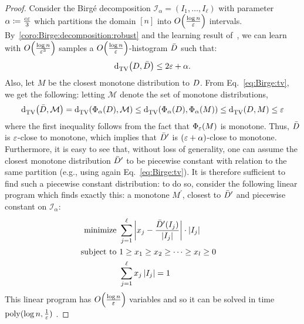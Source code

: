 \begin{proof}  Consider the Birg\'e decomposition $\mathcal{I}_\alpha=(I_1,\dots,I_\ell)$ with parameter $\alpha\coloneqq\frac{c \varepsilon}{3}$ which partitions the domain $[n]$ into $\bigO{\frac{\log n}{\eps}}$ intervals.
  By~\cref{coro:Birge:decomposition:robust} and the learning result of~\cite{Birge:87}, we can learn with $\bigO{\frac{\log n}{\eps^3}}$ samples a $\bigO{\frac{\log n}{\eps}}$-histogram $\bar{D}$ such that:
   \begin{equation}
   {\operatorname{d}_{\textrm{TV}}^{}\!\left({\ensuremath{D}, \bar{\ensuremath{D}}}\right)}\leq 2\varepsilon+\alpha.
\end{equation}    
  Also, let $M$ be the closest monotone distribution to $D$. From Eq.~\eqref{eq:Birge:tv}, we get the following: letting $\mathcal{M}$ denote the set of monotone distributions,   
 \begin{equation}
 {\operatorname{d}_{\textrm{TV}}^{}\!\left({\bar{\ensuremath{D}}, \mathcal{M}}\right)}={\operatorname{d}_{\textrm{TV}}^{}\!\left({\Phi_{\alpha}(D), \mathcal{M}}\right)}\leq {\operatorname{d}_{\textrm{TV}}^{}\!\left({\Phi_{\alpha}(\ensuremath{D}), \Phi_{\alpha}(M)}\right)}\leq {\operatorname{d}_{\textrm{TV}}^{}\!\left({\ensuremath{D}, M}\right)}\leq \varepsilon 
 \end{equation}
  where the first inequality follows from the fact that $\Phi_{\varepsilon}(M)$ is monotone. Thus, $\bar{D}$ is $\varepsilon$-close to monotone, which implies that $\bar{D}^\prime$ is $(\varepsilon+\alpha)$-close to monotone. Furthermore, it is easy to see that, without loss of generality, one can assume the closest monotone distribution $\bar{D}^\prime$ to be piecewise constant with relation to the same partition (e.g., using again Eq.~\eqref{eq:Birge:tv}). It is therefore sufficient to find such a piecewise constant distribution: to do so, consider the following linear program which finds exactly this: a monotone $M^\prime$, closest to $\bar{D}^\prime$ and piecewise constant on $\mathcal{I}_\alpha$:
\begin{alignat*}{2}
    \text{minimize }   & \sum_{j=1}^\ell \left\lvert  x_j - \frac{\bar{D}^\prime(I_j)}{\left\lvert  I_j  \right\rvert}  \right\rvert \cdot \left\lvert  I_j  \right\rvert    \\
    \text{subject to } & 1\geq x_1\geq x_2 \geq \dots \geq x_l \geq 0 & \\
                       &  \sum_{j=1}^\ell x_j\left\lvert  I_j  \right\rvert =1
  \end{alignat*}  
\noindent This linear program has $\bigO{\frac{\log n}{\eps}}$ variables and so it can be solved in time $\operatorname*{poly}(\log n,\frac{1}{\varepsilon})$ .  


\end{proof}
